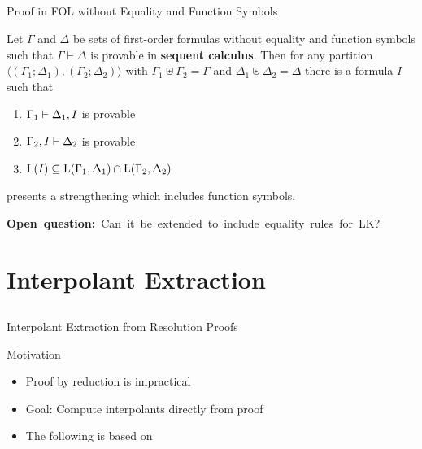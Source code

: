 \documentclass[final,compress]{beamer}
\begin{document}
\subsection{}
\begin{frame}{Proof in FOL without Equality and Function Symbols}


	\begin{lemma}[Maehara]
		Let $\Gamma$ and $\Delta$ be sets of first-order formulas without equality and function symbols such that $\Gamma \vdash \Delta$ is provable in \textbf{sequent calculus}.
		Then for any partition $\langle(\Gamma_1;\Delta_1),(\Gamma_2;\Delta_2)\rangle$ with
		$\Gamma_1 \uplus \Gamma_2 = \Gamma$ and $\Delta_1 \uplus \Delta_2 = \Delta$
		there is a formula $I$ such that
		\begin{enumerate}
			\item $\Gamma_1 \vdash \Delta_1, I$ is provable
			\item $\Gamma_2, I \vdash \Delta_2$ is provable
			\item $\operatorname{L}(I) \subseteq \operatorname{L}(\Gamma_1, \Delta_1) \cap \operatorname{L}(\Gamma_2, \Delta_2)$
		\end{enumerate}
	\end{lemma}

	\pause
	\cite{baaz2011methods} presents a strengthening which includes function symbols.

	\mbox{\textbf{Open question:} Can it be extended to include equality rules for LK?}
\end{frame}

\section{Interpolant Extraction} 

\subsection{}
\begin{frame}{Interpolant Extraction from Resolution Proofs}
	\begin{block}{Motivation}
		\begin{itemize}
			\item Proof by reduction is impractical
			\item Goal: Compute interpolants directly from proof
			\item The following is based on \cite{Huang95}
		\end{itemize}
	\end{block}
\end{frame}
\end{document}
